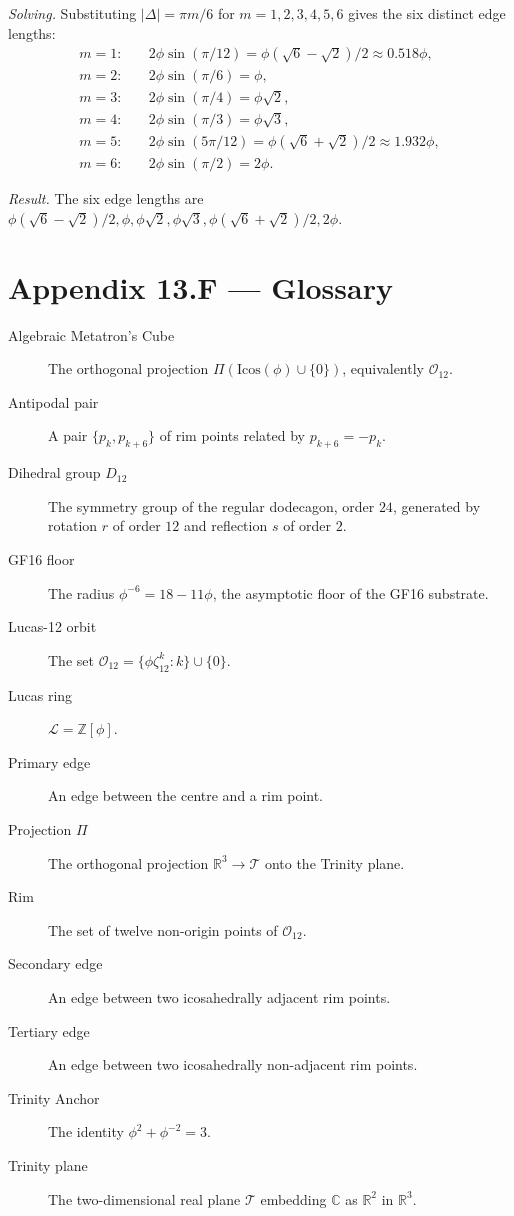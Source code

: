 \emph{Solving.} Substituting $|\Delta| = \pi m/6$ for $m =
1, 2, 3, 4, 5, 6$ gives the six distinct edge lengths:
\begin{align}
  m = 1: & \quad 2\phi \sin(\pi/12) = \phi(\sqrt{6}-\sqrt{2})/2 \approx 0.518\phi,\\
  m = 2: & \quad 2\phi \sin(\pi/6) = \phi,\\
  m = 3: & \quad 2\phi \sin(\pi/4) = \phi\sqrt{2},\\
  m = 4: & \quad 2\phi \sin(\pi/3) = \phi\sqrt{3},\\
  m = 5: & \quad 2\phi \sin(5\pi/12) = \phi(\sqrt{6}+\sqrt{2})/2 \approx 1.932\phi,\\
  m = 6: & \quad 2\phi \sin(\pi/2) = 2\phi.
\end{align}

\emph{Result.} The six edge lengths are
$\phi(\sqrt{6}-\sqrt{2})/2, \phi, \phi\sqrt{2}, \phi\sqrt{3},
\phi(\sqrt{6}+\sqrt{2})/2, 2\phi$.

\section*{Appendix 13.F --- Glossary}
\label{fa_13:sec:13-appF}

\begin{description}
\item[Algebraic Metatron's Cube] The orthogonal projection
  $\Pi(\mathrm{Icos}(\phi) \cup \{0\})$, equivalently
  $\mathcal{O}_{12}$.
\item[Antipodal pair] A pair $\{p_{k}, p_{k+6}\}$ of rim points
  related by $p_{k+6} = -p_{k}$.
\item[Dihedral group $D_{12}$] The symmetry group of the regular
  dodecagon, order $24$, generated by rotation $r$ of order $12$
  and reflection $s$ of order $2$.
\item[GF16 floor] The radius $\phi^{-6} = 18 - 11\phi$, the
  asymptotic floor of the GF16 substrate.
\item[Lucas-12 orbit] The set $\mathcal{O}_{12} = \{\phi
  \zeta_{12}^{k} : k\} \cup \{0\}$.
\item[Lucas ring] $\mathcal{L} = \mathbb{Z}[\phi]$.
\item[Primary edge] An edge between the centre and a rim point.
\item[Projection $\Pi$] The orthogonal projection
  $\mathbb{R}^{3} \to \mathcal{T}$ onto the Trinity plane.
\item[Rim] The set of twelve non-origin points of $\mathcal{O}_{12}$.
\item[Secondary edge] An edge between two icosahedrally adjacent
  rim points.
\item[Tertiary edge] An edge between two icosahedrally
  non-adjacent rim points.
\item[Trinity Anchor] The identity $\phi^{2} + \phi^{-2} = 3$.
\item[Trinity plane] The two-dimensional real plane $\mathcal{T}$
  embedding $\mathbb{C}$ as $\mathbb{R}^{2}$ in $\mathbb{R}^{3}$.
\end{description}

